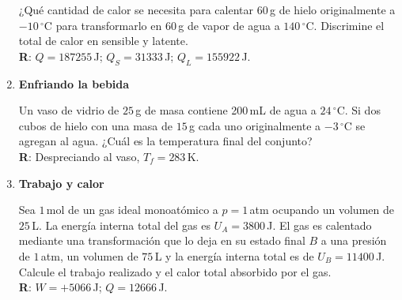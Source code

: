\documentclass[a4paper,12pt]{article}
\begin{document}
\begin{enumerate}
		¿Qué cantidad de calor se necesita para calentar $60$\,g de hielo
		originalmente a $-10\,^\circ$C para transformarlo en $60$\,g de vapor
		de agua a $140\,^\circ$C. Discrimine el total de calor en sensible y
		latente.
		\\{\bf R}: $Q=187255$\,J; $Q_S=31333$\,J; $Q_L=155922$\,J.

	\item {\bf{Enfriando la bebida}}

		Un vaso de vidrio de $25$\,g de masa contiene 200\,mL de agua a
		$24\,^\circ$C. Si dos cubos de hielo con una masa de $15$\,g cada uno
		originalmente a $-3\,^\circ$C se agregan al agua. ¿Cuál es la
		temperatura final del conjunto?
		\\{\bf R}: Despreciando al vaso, $T_f=283$\,K.

	\item {\bf{Trabajo y calor}}

		Sea $1$\,mol de un gas ideal monoatómico a $p=1$\,atm ocupando un volumen de
		$25$\,L. La energía interna total del gas es $U_A=3800$\,J. El gas es
		calentado mediante una transformación que lo deja en su
		estado final $B$ a una presión de $1$\,atm, un volumen de $75$\,L y la
		energía interna total es de $U_B=11400$\,J. Calcule el trabajo realizado y el
		calor total absorbido por el gas.
		\\{\bf R}: $W=+5066$\,J; $Q=12666$\,J.
\end{enumerate}
\end{document}
